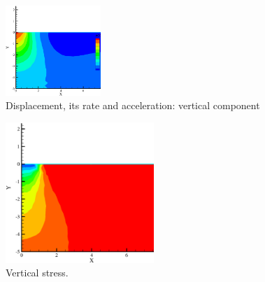 \begin{figure}[!htb]
\begin{center}
\includegraphics[width=0.32\textwidth]{chapter_14/figures/fig_14_1_10_c}
\end{center}
\caption{Displacement, its rate and acceleration: vertical component}
\label{fig_dynHM3}
\end{figure}
\begin{figure}[!htb]
\begin{center}
\includegraphics[width=0.5\textwidth]{chapter_14/figures/fig_14_1_11}
\end{center}
\caption{Vertical stress.}
\label{fig_dynHM4}
\end{figure}